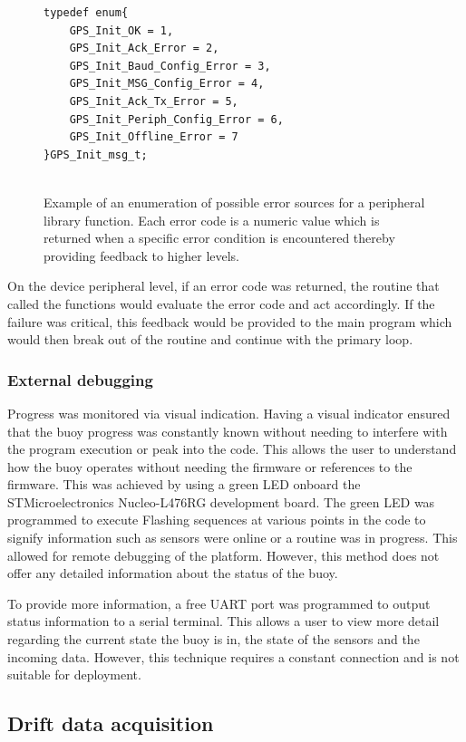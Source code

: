 \begin{figure}[H]
	
	\begin{lstlisting}
typedef enum{
	GPS_Init_OK = 1,
	GPS_Init_Ack_Error = 2,
	GPS_Init_Baud_Config_Error = 3,
	GPS_Init_MSG_Config_Error = 4,
	GPS_Init_Ack_Tx_Error = 5,
	GPS_Init_Periph_Config_Error = 6,
	GPS_Init_Offline_Error = 7
}GPS_Init_msg_t;
		
	\end{lstlisting}
	\caption{ Example of an enumeration of possible error sources for a peripheral library function. Each error code is a numeric value which is returned when a specific error condition is encountered thereby providing feedback to higher levels.}
	\label{fig:errorcode}
\end{figure}


 On the device peripheral level, if an error code was returned, the routine that called the functions would evaluate the error code and act accordingly. If the failure was critical, this feedback would be provided to the main program which would then break out of the routine and continue with the primary loop.
\subsubsection{External debugging}

Progress was monitored via visual indication. Having a visual indicator ensured that the buoy progress was constantly known without needing to interfere with the program execution or peak into the code. This allows the user to understand how the buoy operates without needing the firmware or references to the firmware. This was achieved by using a green LED onboard the STMicroelectronics Nucleo-L476RG development board. The green LED was programmed to execute Flashing sequences at various points in the code to signify information such as sensors were online or a routine was in progress. This allowed for remote debugging of the platform. However, this method does not offer any detailed information about the status of the buoy. \par

To provide more information, a free UART port was programmed to output status information to a serial terminal. This allows a user to view more detail regarding the current state the buoy is in, the state of the sensors and the incoming data. However, this technique requires a constant connection and is not suitable for deployment.
\subsection{Drift data acquisition}

